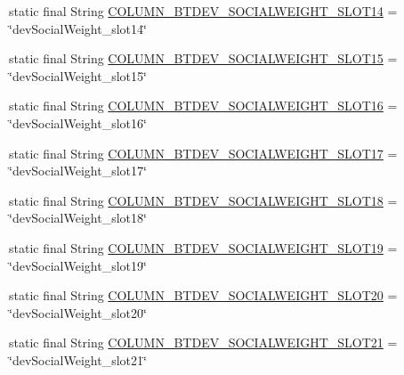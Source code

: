 \begin{DoxyCompactItemize}
\item 
static final String \hyperlink{classcom_1_1copelabs_1_1oiframework_1_1socialproximity_1_1_s_q_lite_helper_ac1461c591a665dd4e755b6f7fc11f55b}{C\+O\+L\+U\+M\+N\+\_\+\+B\+T\+D\+E\+V\+\_\+\+S\+O\+C\+I\+A\+L\+W\+E\+I\+G\+H\+T\+\_\+\+S\+L\+O\+T14} = \char`\"{}dev\+Social\+Weight\+\_\+slot14\char`\"{}
\item 
static final String \hyperlink{classcom_1_1copelabs_1_1oiframework_1_1socialproximity_1_1_s_q_lite_helper_abb5afec5483108b0319022aabc9d02df}{C\+O\+L\+U\+M\+N\+\_\+\+B\+T\+D\+E\+V\+\_\+\+S\+O\+C\+I\+A\+L\+W\+E\+I\+G\+H\+T\+\_\+\+S\+L\+O\+T15} = \char`\"{}dev\+Social\+Weight\+\_\+slot15\char`\"{}
\item 
static final String \hyperlink{classcom_1_1copelabs_1_1oiframework_1_1socialproximity_1_1_s_q_lite_helper_aff8fa4900ad4c918290cb481420642ef}{C\+O\+L\+U\+M\+N\+\_\+\+B\+T\+D\+E\+V\+\_\+\+S\+O\+C\+I\+A\+L\+W\+E\+I\+G\+H\+T\+\_\+\+S\+L\+O\+T16} = \char`\"{}dev\+Social\+Weight\+\_\+slot16\char`\"{}
\item 
static final String \hyperlink{classcom_1_1copelabs_1_1oiframework_1_1socialproximity_1_1_s_q_lite_helper_a8b0ca4967088b589f3a10967f17312ea}{C\+O\+L\+U\+M\+N\+\_\+\+B\+T\+D\+E\+V\+\_\+\+S\+O\+C\+I\+A\+L\+W\+E\+I\+G\+H\+T\+\_\+\+S\+L\+O\+T17} = \char`\"{}dev\+Social\+Weight\+\_\+slot17\char`\"{}
\item 
static final String \hyperlink{classcom_1_1copelabs_1_1oiframework_1_1socialproximity_1_1_s_q_lite_helper_a1482c345a58159281681a8436f358782}{C\+O\+L\+U\+M\+N\+\_\+\+B\+T\+D\+E\+V\+\_\+\+S\+O\+C\+I\+A\+L\+W\+E\+I\+G\+H\+T\+\_\+\+S\+L\+O\+T18} = \char`\"{}dev\+Social\+Weight\+\_\+slot18\char`\"{}
\item 
static final String \hyperlink{classcom_1_1copelabs_1_1oiframework_1_1socialproximity_1_1_s_q_lite_helper_a1d6ed81d0f71c0d72cff6704f9133495}{C\+O\+L\+U\+M\+N\+\_\+\+B\+T\+D\+E\+V\+\_\+\+S\+O\+C\+I\+A\+L\+W\+E\+I\+G\+H\+T\+\_\+\+S\+L\+O\+T19} = \char`\"{}dev\+Social\+Weight\+\_\+slot19\char`\"{}
\item 
static final String \hyperlink{classcom_1_1copelabs_1_1oiframework_1_1socialproximity_1_1_s_q_lite_helper_ac2388134ddf6cb6fc648557572e99ba0}{C\+O\+L\+U\+M\+N\+\_\+\+B\+T\+D\+E\+V\+\_\+\+S\+O\+C\+I\+A\+L\+W\+E\+I\+G\+H\+T\+\_\+\+S\+L\+O\+T20} = \char`\"{}dev\+Social\+Weight\+\_\+slot20\char`\"{}
\item 
static final String \hyperlink{classcom_1_1copelabs_1_1oiframework_1_1socialproximity_1_1_s_q_lite_helper_a7953ea4bddb3b50337a08ae46ab7a16e}{C\+O\+L\+U\+M\+N\+\_\+\+B\+T\+D\+E\+V\+\_\+\+S\+O\+C\+I\+A\+L\+W\+E\+I\+G\+H\+T\+\_\+\+S\+L\+O\+T21} = \char`\"{}dev\+Social\+Weight\+\_\+slot21\char`\"{}

\end{DoxyCompactItemize}
